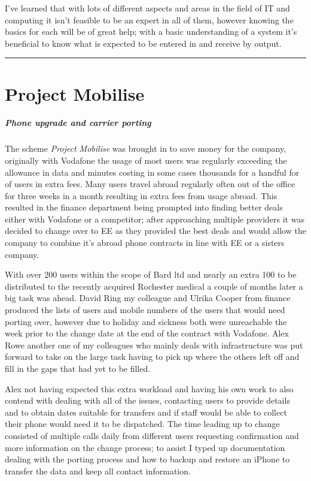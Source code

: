 I've learned that with lots of different aspects and areas in the field
of IT and computing it isn't feasible to be an expert in all of them,
however knowing the basics for each will be of great help; with a basic
understanding of a system it's beneficial to know what is expected to be
entered in and receive by output.

\begin{center}\rule{0.5\linewidth}{\linethickness}\end{center}

\section{Project Mobilise}\label{project-mobilise}

\subparagraph{Phone upgrade and carrier
porting}\label{phone-upgrade-and-carrier-porting}

The scheme \emph{Project Mobilise} was brought in to save money for the
company, originally with Vodafone the usage of most users was regularly
exceeding the allowance in data and minutes costing in some cases
thousands for a handful for of users in extra fees. Many users travel
abroad regularly often out of the office for three weeks in a month
resulting in extra fees from usage abroad. This resulted in the finance
department being prompted into finding better deals either with Vodafone
or a competitor; after approaching multiple providers it was decided to
change over to EE as they provided the best deals and would allow the
company to combine it's abroad phone contracts in line with EE or a
sisters company.

With over 200 users within the scope of Bard ltd and nearly an extra 100
to be distributed to the recently acquired Rochester medical a couple of
months later a big task was ahead. David Ring my colleague and Ulrika
Cooper from finance produced the lists of users and mobile numbers of
the users that would need porting over, however due to holiday and
sickness both were unreachable the week prior to the change date at the
end of the contract with Vodafone. Alex Rowe another one of my
colleagues who mainly deals with infrastructure was put forward to take
on the large task having to pick up where the others left off and fill
in the gaps that had yet to be filled.

Alex not having expected this extra workload and having his own work to
also contend with dealing with all of the issues, contacting users to
provide details and to obtain dates suitable for transfers and if staff
would be able to collect their phone would need it to be dispatched. The
time leading up to change consisted of multiple calls daily from
different users requesting confirmation and more information on the
change process; to assist I typed up documentation dealing with the
porting process and how to backup and restore an iPhone to transfer the
data and keep all contact information.

